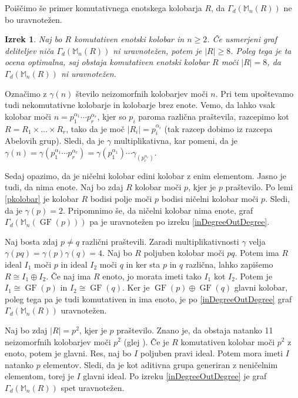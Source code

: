 \documentclass[a4paper, 12pt]{amsart}
\theoremstyle{definition} %
\theoremstyle{plain} %
\newtheorem{izrek}[definicija]{Izrek}
\newcommand{\M}{\mathbb M}
\DeclareMathOperator{\GF}{GF}
\begin{document}
Poiščimo še primer komutativnega enotskega kolobarja $R$, da $\Gamma_d(\M_n(R))$ ne bo uravnotežen.

\begin{izrek}
Naj bo $R$ komutativen enotski kolobar in $n\ge2$. Če usmerjeni graf deliteljev niča $\Gamma_d(\M_n(R))$ ni uravnotežen, potem je $|R| \ge 8$. Poleg tega je ta ocena optimalna, saj obstaja komutativen enotski kolobar $R$ moči $|R|=8$, da $\Gamma_d(\M_n(R))$ ni uravnotežen. 
\end{izrek} 

\proof
Označimo z $\gamma(n)$ število neizomorfnih kolobarjev moči $n$. Pri tem upoštevamo tudi nekomutativne kolobarje in kolobarje brez enote. Vemo, da lahko vsak kolobar moči $n=p_1^{\alpha_1}\cdots p_r^{\alpha_r}$, kjer so $p_i$ paroma različna praštevila, razcepimo kot $R=R_1\times \dots \times R_r$, tako da je moč $|R_i| = p_i^{\alpha_i}$ (tak razcep dobimo iz razcepa Abelovih grup). Sledi, da je $\gamma$ multiplikativna, kar pomeni, da je $\gamma(n) = \gamma(p_1^{\alpha_1}\cdots p_r^{\alpha_r}) = \gamma(p_1^{\alpha_1})\cdots \gamma_(p_r^{\alpha_r})$. 

Sedaj opazimo, da je ničelni kolobar edini kolobar  z enim elementom. Jasno je tudi, da nima enote. Naj bo zdaj $R$ kolobar moči $p$, kjer je $p$ praštevilo. Po lemi \ref{pkolobar} je kolobar $R$ bodisi polje moči $p$ bodisi ničelni kolobar moči $p$. Sledi, da je $\gamma(p)= 2$. Pripomnimo še, da ničelni kolobar nima enote, graf $\Gamma_d(\M_n(\GF(p)))$ pa je uravnotežen po izreku \ref{inDegreeOutDegree}. 

Naj bosta zdaj $p\neq q$ različni praštevili. Zaradi multiplikativnosti $\gamma$ velja $\gamma(pq) = \gamma(p)\gamma(q) = 4$. Naj bo $R$ poljuben kolobar moči $pq$. Potem ima $R$ ideal $I_1$ moči $p$ in ideal $I_2$ moči $q$ in ker sta $p$ in $q$ različna, lahko zapišemo $R\cong I_1 \oplus I_2$. Če naj ima $R$ enoto, jo morata imeti tako $I_1$ kot $I_2$. Potem je $I_1\cong \GF(p)$ in $I_2\cong \GF(q)$. Ker je $\GF(p) \oplus \GF(q)$ glavni kolobar, poleg tega pa je tudi komutativen in ima enoto, je po \ref{inDegreeOutDegree} graf $\Gamma_d(\M_n(R))$ uravnotežen. 

Naj bo zdaj $|R|=p^2$, kjer je $p$ praštevilo. Znano je, da obstaja natanko 11 neizomorfnih kolobarjev moči $p^2$ (glej \cite{Fine}). Če je $R$ komutativen kolobar moči $p^2$ z enoto, potem je glavni. Res, naj bo $I$ poljuben pravi ideal. Potem mora imeti $I$ natanko $p$ elementov. Sledi, da je kot aditivna grupa generiran z neničelnim elementom, torej je $I$ glavni ideal. Po izreku \ref{inDegreeOutDegree} je graf $\Gamma_d(\M_n(R))$ spet uravnotežen.
\end{document}
